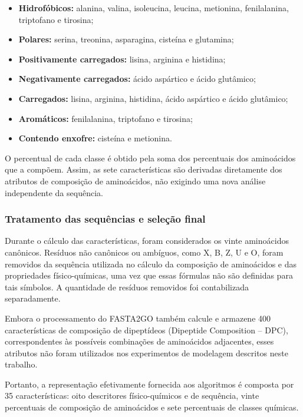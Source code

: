 \begin{itemize}
    \item \textbf{Hidrofóbicos:} alanina, valina, isoleucina, leucina, metionina, fenilalanina, triptofano e tirosina;
    \item \textbf{Polares:} serina, treonina, asparagina, cisteína e glutamina;
    \item \textbf{Positivamente carregados:} lisina, arginina e histidina;
    \item \textbf{Negativamente carregados:} ácido aspártico e ácido glutâmico;
    \item \textbf{Carregados:} lisina, arginina, histidina, ácido aspártico e ácido glutâmico;
    \item \textbf{Aromáticos:} fenilalanina, triptofano e tirosina;
    \item \textbf{Contendo enxofre:} cisteína e metionina.
\end{itemize}

O percentual de cada classe é obtido pela soma dos percentuais dos aminoácidos que a compõem. Assim, as sete características são derivadas diretamente dos atributos de composição de aminoácidos, não exigindo uma nova análise independente da sequência.

\subsubsection{Tratamento das sequências e seleção final}

Durante o cálculo das características, foram considerados os vinte aminoácidos canônicos. Resíduos não canônicos ou ambíguos, como X, B, Z, U e O, foram removidos da sequência utilizada no cálculo da composição de aminoácidos e das propriedades físico-químicas, uma vez que essas fórmulas não são definidas para tais símbolos. A quantidade de resíduos removidos foi contabilizada separadamente.

Embora o processamento do FASTA2GO também calcule e armazene 400 características de composição de dipeptídeos (Dipeptide Composition -- DPC), correspondentes às possíveis combinações de aminoácidos adjacentes, esses atributos não foram utilizados nos experimentos de modelagem descritos neste trabalho.

Portanto, a representação efetivamente fornecida aos algoritmos é composta por 35 características: oito descritores físico-químicos e de sequência, vinte percentuais de composição de aminoácidos e sete percentuais de classes químicas.

